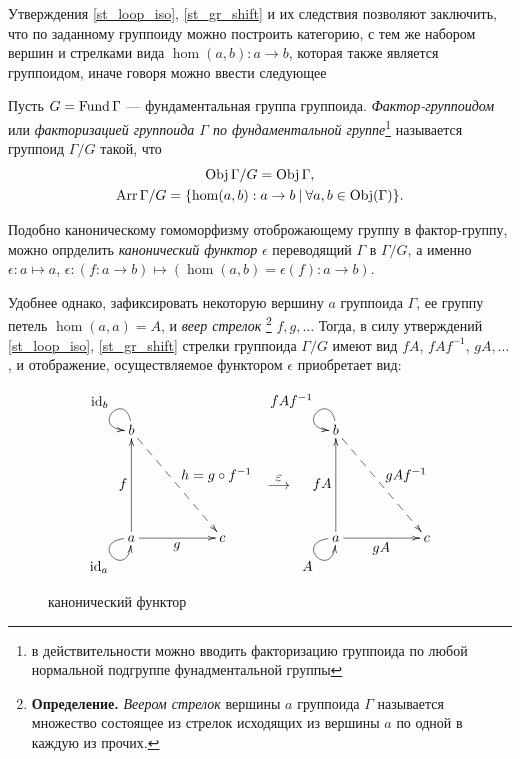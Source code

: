     \bigskip

    Утверждения \ref{st_loop_iso}, \ref{st_gr_shift} и их следствия позволяют 
    заключить, что по заданному группоиду можно построить категорию, с тем же 
    набором вершин и стрелками вида $\hom(a,b) : a \to b$, которая также 
    является группоидом, иначе говоря можно ввести следующее

    \begin{definition}
        Пусть $G = \operatorname*{Fund} \Gamma$ --- фундаментальная группа группоида. 
        \emph{Фактор-группоидом} или \emph{факторизацией группоида $\Gamma$ по 
        фундаментальной группе}\footnote{в действительности можно вводить 
        факторизацию группоида по любой нормальной подгруппе фунадментальной 
        группы} 
        называется группоид $\Gamma/G$ такой, что 
        \begin{gather*}
            \operatorname*{Obj} \Gamma/G = \operatorname*{Obj} \Gamma,\\
            \operatorname*{Arr} \Gamma/G = \{\hom(a,b) : a \to b \:|\: \forall a,b \in \operatorname*{Obj} (\Gamma)\}.
        \end{gather*}
    \end{definition}

    Подобно каноническому гомоморфизму отоброжающему группу в фактор-группу, 
    можно опрделить \emph{канонический функтор} $\epsilon$ переводящий $\Gamma$ 
    в $\Gamma/G$, а именно $\epsilon : a \mapsto a$, 
    $\epsilon : (f: a \to b) \mapsto (\hom(a,b) = \epsilon(f) : a \to b)$.
    
    \bigskip

    Удобнее однако, зафиксировать некоторую вершину $a$ группоида $\Gamma$, ее 
    группу петель $\hom(a,a) = A$, и \emph{веер стрелок}
    \footnote{\textbf{Определение.} \emph{Веером стрелок} вершины 
    $a$ группоида $\Gamma$ называется множество состоящее из стрелок исходящих 
    из вершины $a$ по одной в каждую из прочих.}
     $f,g,\ldots$ Тогда, в силу утверждений \ref{st_loop_iso}, 
    \ref{st_gr_shift} стрелки группоида $\Gamma /G$ имеют вид $fA$, $fAf^{-1}$, 
    $gA,\ldots$, и отображение, осуществляемое функтором $\epsilon$ приобретает 
    вид:

    \begin{figure}[h]
        \centering
        \[\xymatrix{
            b \ar@(u,l)[]_{\textstyle{\id_b}}\ar@{-->}[ddrr]^{\textstyle{h=g \circ f^{-1}}}     & &   &                                                     & b \ar@(u,l)[]_{\textstyle{fAf^{-1}}} \ar@{-->}[ddrr]^{\textstyle{g A f^{-1}}}     & &  \\
                                                                                                & &   & \stackrel{\textstyle{\epsilon}}{\longrightarrow}    &                                                                                   & &  \\
            a \ar@(l,d)[]_{\textstyle{\id_a}} \ar[uu]^{\textstyle{f}} \ar[rr]_{\textstyle{g}}   & & c &                                                     & a \ar@(l,d)[]_{\textstyle{A}} \ar[uu]^{\textstyle{fA}} \ar[rr]_{\textstyle{gA}}   & & c
        }\]
        \caption{канонический функтор}
        \label{cd_can_func}
    \end{figure}


